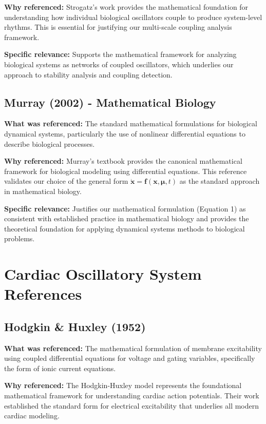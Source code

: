 \documentclass{article}
\begin{document}
\textbf{Why referenced:} Strogatz's work provides the mathematical foundation for understanding how individual biological oscillators couple to produce system-level rhythms. This is essential for justifying our multi-scale coupling analysis framework.

\textbf{Specific relevance:} Supports the mathematical framework for analyzing biological systems as networks of coupled oscillators, which underlies our approach to stability analysis and coupling detection.

\subsection{Murray (2002) - Mathematical Biology}

\textbf{What was referenced:} The standard mathematical formulations for biological dynamical systems, particularly the use of nonlinear differential equations to describe biological processes.

\textbf{Why referenced:} Murray's textbook provides the canonical mathematical framework for biological modeling using differential equations. This reference validates our choice of the general form $\dot{\mathbf{x}} = \mathbf{f}(\mathbf{x}, \boldsymbol{\mu}, t)$ as the standard approach in mathematical biology.

\textbf{Specific relevance:} Justifies our mathematical formulation (Equation 1) as consistent with established practice in mathematical biology and provides the theoretical foundation for applying dynamical systems methods to biological problems.

\section{Cardiac Oscillatory System References}

\subsection{Hodgkin \& Huxley (1952)}

\textbf{What was referenced:} The mathematical formulation of membrane excitability using coupled differential equations for voltage and gating variables, specifically the form of ionic current equations.

\textbf{Why referenced:} The Hodgkin-Huxley model represents the foundational mathematical framework for understanding cardiac action potentials. Their work established the standard form for electrical excitability that underlies all modern cardiac modeling.
\end{document}
